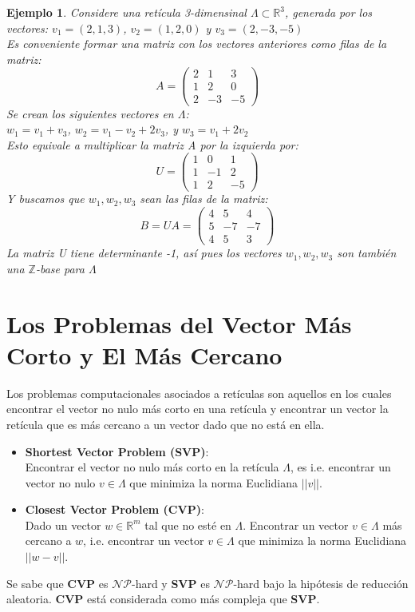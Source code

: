 \documentclass[12pt]{report}
\newtheorem{ex}{Ejemplo}
\begin{document}
\begin{ex}
Considere una retícula 3-dimensinal $\Lambda\subset \mathbb{R}^3$, generada por los vectores:
        $v_{1} = (2,1,3)$, $v_{2} = (1,2,0)$ y $v_{3} = (2,-3,-5)$ \\
Es conveniente formar una matriz con los vectores anteriores como filas de la matriz:
 \[A = \left(\begin{smallmatrix}
2 &  1 &  3\\
1 &  2 &  0\\
2 & -3 & -5
\end{smallmatrix}\right)
\]
Se crean los siguientes vectores en $\Lambda$:\\
$w_{1}=v_{1} + v_{3}$, $w_{2}=v_{1} - v_{2} + 2v_{3}$, y $w_{3} = v_{1} + 2v_{2}$ \\
Esto equivale a multiplicar la matriz A por la izquierda por:
 \[U = \left(\begin{smallmatrix}
1 &  0 &  1 \\
1 & -1 &  2 \\
1 & 2 & -5
\end{smallmatrix}\right)
\]
Y buscamos que $w_{1}, w_{2}, w_{3}$ sean las filas de la matriz: 
\[B = UA = \left(\begin{smallmatrix}
4 &  5 & 4 \\
5 & -7 & -7 \\
4 & 5 & 3
\end{smallmatrix}\right)
\]
La matriz U tiene determinante -1, así pues los vectores $w_{1}, w_{2}, w_{3}$ son también una $\mathbb{Z}$-base para $\Lambda$

\end{ex}
\newpage

\section{Los Problemas del Vector Más Corto y El Más Cercano}
Los problemas computacionales asociados a retículas son aquellos en los cuales encontrar el vector no nulo más corto en una retícula y encontrar un vector la retícula que es más cercano a un vector dado que no está en ella.

\begin{itemize}
\item  \textbf{Shortest Vector Problem (SVP)}:\\
Encontrar el vector no nulo más corto en la retícula $\Lambda$, es i.e. encontrar un vector no nulo $v\in\Lambda$ que minimiza la norma Euclidiana $||v||$.
\item \textbf{Closest Vector Problem (CVP)}:\\
Dado un vector $w \in \mathbb{R}^{m}$ tal que no esté en $\Lambda$. Encontrar un vector  $v \in \Lambda$ más cercano a $w$, i.e. encontrar un vector $v \in \Lambda$ que minimiza la norma Euclidiana  $||w-v||$.
\end{itemize}
Se sabe que \textbf{CVP} es $\mathcal{NP}$-hard y \textbf{SVP} es $\mathcal{NP}$-hard bajo la hipótesis de reducción aleatoria. \textbf{CVP} está considerada como más compleja que \textbf{SVP}.
\end{document}
